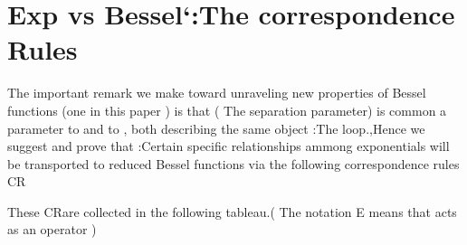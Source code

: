 \documentclass[a4paper,11pt]{article}
\begin{document}
\section{ Exp\coordHE{} vs Bessel`\coordHE{}:The correspondence Rules}

\myHighlight{$\bigskip $}\coordHE{}

The important remark we make toward unraveling new properties of Bessel
functions (one in this paper ) is that (\coordHE{} The separation parameter)
is common a parameter to \coordHE{} and to \coordHE{},
both describing the same object :The \coordHE{}loop.,Hence we suggest and prove
that :Certain specific relationships ammong  exponentials will be
transported to reduced Bessel functions via the following correspondence
rules CR\coordHE{}

\myHighlight{$\bigskip \ $}\coordHE{}These CR\coordHE{}are collected in the following tableau.(
The notation E\coordHE{} means that \coordHE{} acts as an operator
)
\end{document}
